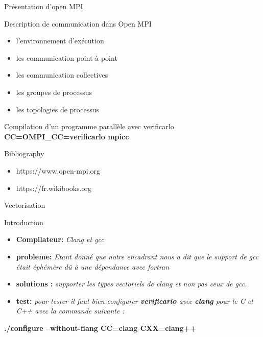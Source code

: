 \documentclass{beamer}
\begin{document}
\begin{frame}{Présentation d'open MPI}
    \begin{block}{Description de communication dans Open MPI}
      \begin{itemize}
          \item l’environnement d’exécution
          \item les communication point à point
          \item les communication collectives
          \item les groupes de processus
          \item les topologies de processus
      \end{itemize}
    \end{block}
    
    \begin{block}{Compilation d’un programme parallèle avec verificarlo}
      \textbf{CC=OMPI\_CC=verificarlo mpicc}
    \end{block}
    \begin{block}{Bibliography}
        \begin{itemize}
            \item https://www.open-mpi.org
            \item https://fr.wikibooks.org
        \end{itemize}      
    \end{block}
\end{frame}

\begin{frame}{Vectorisation}
\begin{block}{Introduction }
    \begin{itemize}
        \item \textbf{Compilateur:} \textit{ Clang et gcc} 
        \item \textbf{probleme:} \textit{ Etant donné que notre encadrant nous a dit que le support de
gcc était éphémère dû à une dépendance avec fortran}
         \item \textbf{solutions : } \textit{supporter les types vectoriels de clang et non pas ceux de gcc. }
         \item \textbf{test: } \textit{ pour tester il faut bien configurer \textbf{verificarlo} avec \textbf {clang} pour le C et C++ avec la commande suivante : }
         \end{itemize}
         \begin{center}
        \textbf{\color{blue} ./configure --without-flang CC=clang CXX=clang++ }      
          \end{center}
  \end{block}
\end{frame}
\end{document}
